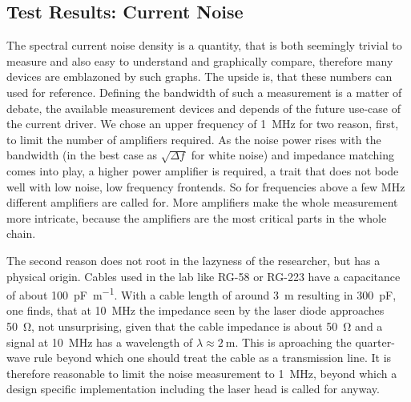 \subsection{Test Results: Current Noise}
\label{sec:results_current_noise}
The spectral current noise density is a quantity, that is both seemingly trivial to measure and also easy to understand and graphically compare, therefore many devices are emblazoned by such graphs. The upside is, that these numbers can used for reference. Defining the bandwidth of such a measurement is a matter of debate, the available measurement devices and depends of the future use-case of the current driver. We chose an upper frequency of \qty{1}{\MHz} for two reason, first, to limit the number of amplifiers required. As the noise power rises with the bandwidth (in the best case as $\sqrt{\Delta f}$ for white noise) and impedance matching comes into play, a higher power amplifier is required, a trait that does not bode well with low noise, low frequency frontends. So for frequencies above a few \unit{\MHz} different amplifiers are called for. More amplifiers make the whole measurement more intricate, because the amplifiers are the most critical parts in the whole chain.

The second reason does not root in the lazyness of the researcher, but has a physical origin. Cables used in the lab like RG-58 or RG-223 have a capacitance of about \qty{100}{\pF \per \m}. With a cable length of around \qty{3}{\m} resulting in \qty{300}{\pF}, one finds, that at \qty{10}{\MHz} the impedance seen by the laser diode approaches \qty{50}{\ohm}, not unsurprising, given that the cable impedance is about \qty{50}{\ohm} and a signal at \qty{10}{\MHz} has a wavelength of $\lambda \approx \qty{2}{\m}$. This is aproaching the quarter-wave rule beyond which one should treat the cable as a transmission line. It is therefore reasonable to limit the noise measurement to \qty{1}{\MHz}, beyond which a design specific implementation including the laser head is called for anyway.

\clearpage
